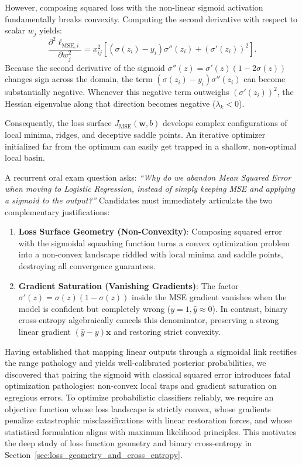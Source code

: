 However, composing squared loss with the non-linear sigmoid activation fundamentally breaks convexity. Computing the second derivative with respect to scalar $w_j$ yields:
\begin{equation}
\frac{\partial^2 \ell_{\text{MSE}, i}}{\partial w_j^2} = x_{ij}^2 \left[ (\sigma(z_i) - y_i) \sigma''(z_i) + (\sigma'(z_i))^2 \right].
\end{equation}
Because the second derivative of the sigmoid $\sigma''(z) = \sigma'(z)(1 - 2\sigma(z))$ changes sign across the domain, the term $(\sigma(z_i) - y_i)\sigma''(z_i)$ can become substantially negative. Whenever this negative term outweighs $(\sigma'(z_i))^2$, the Hessian eigenvalue along that direction becomes negative ($\lambda_k < 0$). 

Consequently, the loss surface $J_{\text{MSE}}(\mathbf{w}, b)$ develops complex configurations of local minima, ridges, and deceptive saddle points. An iterative optimizer initialized far from the optimum can easily get trapped in a shallow, non-optimal local basin.

\begin{examinsight}
A recurrent oral exam question asks: \emph{``Why do we abandon Mean Squared Error when moving to Logistic Regression, instead of simply keeping MSE and applying a sigmoid to the output?''}
Candidates must immediately articulate the two complementary justifications:
\begin{enumerate}[noitemsep]
  \item \textbf{Loss Surface Geometry (Non-Convexity)}: Composing squared error with the sigmoidal squashing function turns a convex optimization problem into a non-convex landscape riddled with local minima and saddle points, destroying all convergence guarantees.
  \item \textbf{Gradient Saturation (Vanishing Gradients)}: The factor $\sigma'(z) = \sigma(z)(1-\sigma(z))$ inside the MSE gradient vanishes when the model is confident but completely wrong ($y=1, \hat{y} \approx 0$). In contrast, binary cross-entropy algebraically cancels this denominator, preserving a strong linear gradient $(\hat{y} - y)\mathbf{x}$ and restoring strict convexity.
\end{enumerate}
\end{examinsight}

Having established that mapping linear outputs through a sigmoidal link rectifies the range pathology and yields well-calibrated posterior probabilities, we discovered that pairing the sigmoid with classical squared error introduces fatal optimization pathologies: non-convex local traps and gradient saturation on egregious errors. To optimize probabilistic classifiers reliably, we require an objective function whose loss landscape is strictly convex, whose gradients penalize catastrophic misclassifications with linear restoration forces, and whose statistical formulation aligns with maximum likelihood principles. This motivates the deep study of loss function geometry and binary cross-entropy in Section~\ref{sec:loss_geometry_and_cross_entropy}.

